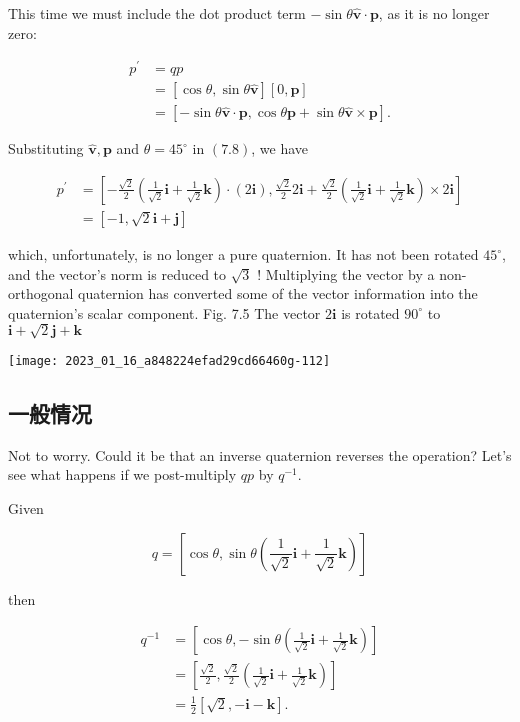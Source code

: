 This time we must include the dot product term $-\sin \theta \hat{\mathbf{v}} \cdot \mathbf{p}$, as it is no longer zero:

$$
\begin{aligned}
p^{\prime} & =q p \\
& =[\cos \theta, \sin \theta \hat{\mathbf{v}}][0, \mathbf{p}] \\
& =[-\sin \theta \hat{\mathbf{v}} \cdot \mathbf{p}, \cos \theta \mathbf{p}+\sin \theta \hat{\mathbf{v}} \times \mathbf{p}] .
\end{aligned}
$$

Substituting $\hat{\mathbf{v}}, \mathbf{p}$ and $\theta=45^{\circ}$ in $(7.8)$, we have

$$
\begin{aligned}
p^{\prime} & =\left[-\frac{\sqrt{2}}{2}\left(\frac{1}{\sqrt{2}} \mathbf{i}+\frac{1}{\sqrt{2}} \mathbf{k}\right) \cdot(2 \mathbf{i}), \frac{\sqrt{2}}{2} 2 \mathbf{i}+\frac{\sqrt{2}}{2}\left(\frac{1}{\sqrt{2}} \mathbf{i}+\frac{1}{\sqrt{2}} \mathbf{k}\right) \times 2 \mathbf{i}\right] \\
& =[-1, \sqrt{2} \mathbf{i}+\mathbf{j}]
\end{aligned}
$$

which, unfortunately, is no longer a pure quaternion. It has not been rotated $45^{\circ}$, and the vector's norm is reduced to $\sqrt{3}$ ! Multiplying the vector by a non-orthogonal quaternion has converted some of the vector information into the quaternion's scalar component. Fig. 7.5 The vector $2 \mathbf{i}$ is rotated $90^{\circ}$ to $\mathbf{i}+\sqrt{2} \mathbf{j}+\mathbf{k}$

\begin{center}
\texttt{[image: 2023\_01\_16\_a848224efad29cd66460g-112]}
\end{center}

\subsection{一般情况}
Not to worry. Could it be that an inverse quaternion reverses the operation? Let's see what happens if we post-multiply $q p$ by $q^{-1}$.

Given

$$
q=\left[\cos \theta, \sin \theta\left(\frac{1}{\sqrt{2}} \mathbf{i}+\frac{1}{\sqrt{2}} \mathbf{k}\right)\right]
$$

then

$$
\begin{aligned}
q^{-1} & =\left[\cos \theta,-\sin \theta\left(\frac{1}{\sqrt{2}} \mathbf{i}+\frac{1}{\sqrt{2}} \mathbf{k}\right)\right] \\
& =\left[\frac{\sqrt{2}}{2}, \frac{\sqrt{2}}{2}\left(\frac{1}{\sqrt{2}} \mathbf{i}+\frac{1}{\sqrt{2}} \mathbf{k}\right)\right] \\
& =\frac{1}{2}[\sqrt{2},-\mathbf{i}-\mathbf{k}] .
\end{aligned}
$$

